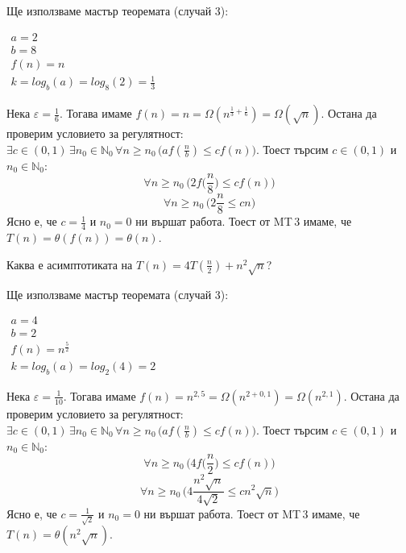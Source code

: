 \begin{solution}
	Ще използваме $\hyperref[th:master-theorem]{\text{мастър теоремата}}$ (случай 3):
	\begin{center}
		$\begin{array}{|l}
			a=2\\
			b=8\\
			f(n)=n\\
			k=log_b(a)=log_8(2)=\frac13
		\end{array}$
	\end{center}
	Нека $\varepsilon=\frac16$. Тогава имаме $f(n)=n=\Omega(n^{\frac13+\frac16})=\Omega(\sqrt n)$. Остана да проверим условието за регулятност: $\exists c\in(0,1)\,\exists n_0\in\mathbb{N}_0\,\forall n\ge n_0\,\big(af(\frac nb)\le cf(n)\big)$. Тоест търсим $c\in(0,1)$ и $n_0\in\mathbb{N}_0$:
	\begin{equation*}
		\forall n\ge n_0\,\bigg(2f\Big(\frac n8\Big)\le cf(n)\bigg)
	\end{equation*}
	\begin{equation*}
		\forall n\ge n_0\,\bigg(2\frac n8\le cn\bigg)
	\end{equation*}
	Ясно е, че $c=\frac14$ и $n_0=0$ ни вършат работа. Тоест от MT\,3 имаме, че $T(n)=\theta(f(n))=\theta(n)$.
\end{solution}\leavevmode\newline

\begin{problem}
	Каква е асимптотиката на $T(n)=4T(\frac n2)+n^2\sqrt n$?
\end{problem}

\begin{solution}
	Ще използваме $\hyperref[th:master-theorem]{\text{мастър теоремата}}$ (случай 3):
	\begin{center}
		$\begin{array}{|l}
			a=4\\
			b=2\\
			f(n)=n^{\frac52}\\
			k=log_b(a)=log_2(4)=2
		\end{array}$
	\end{center}
	Нека $\varepsilon=\frac1{10}$. Тогава имаме $f(n)=n^{2,5}=\Omega(n^{2+0,1})=\Omega(n^{2,1})$. Остана да проверим условието за регулятност: $\exists c\in(0,1)\,\exists n_0\in\mathbb{N}_0\,\forall n\ge n_0\,\big(af(\frac nb)\le cf(n)\big)$. Тоест търсим $c\in(0,1)$ и $n_0\in\mathbb{N}_0$:
	\begin{equation*}
		\forall n\ge n_0\,\bigg(4f\Big(\frac n2\Big)\le cf(n)\bigg)
	\end{equation*}
	\begin{equation*}
		\forall n\ge n_0\,\bigg(4\frac {n^2\sqrt n}{4\sqrt2}\le cn^2\sqrt n\bigg)
	\end{equation*}
	Ясно е, че $c=\frac1{\sqrt2}$ и $n_0=0$ ни вършат работа. Тоест от MT\,3 имаме, че $T(n)=\theta(n^2\sqrt n)$.
\end{solution}

